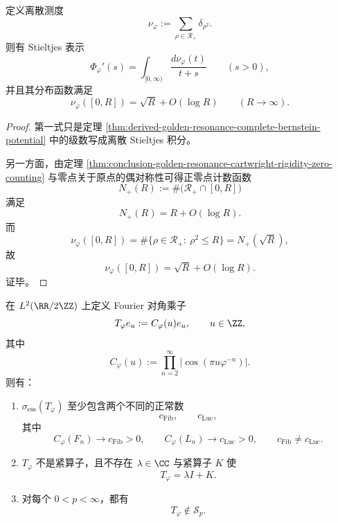 \begin{corollary}[平方零点测度的精确平方根计数律]\label{cor:derived-golden-resonance-squared-zero-measure-sqrt-law}
定义离散测度
\[
\nu_\varphi:=\sum_{\rho\in\mathcal R_+}\delta_{\rho^2}.
\]
则有 Stieltjes 表示
\[
\Phi_\varphi'(s)
=
\int_{[0,\infty)}\frac{d\nu_\varphi(t)}{t+s}
\qquad (s>0),
\]
并且其分布函数满足
\[
\nu_\varphi([0,R])=\sqrt R+O(\log R)
\qquad (R\to\infty).
\]
\end{corollary}

\begin{proof}
第一式只是定理
\ref{thm:derived-golden-resonance-complete-bernstein-potential}
中的级数写成离散 Stieltjes 积分。

另一方面，由定理
\ref{thm:conclusion-golden-resonance-cartwright-rigidity-zero-counting}
与零点关于原点的偶对称性可得正零点计数函数
\[
N_+(R):=\#\bigl(\mathcal R_+\cap[0,R]\bigr)
\]
满足
\[
N_+(R)=R+O(\log R).
\]
而
\[
\nu_\varphi([0,R])
=
\#\{\rho\in\mathcal R_+:\ \rho^2\le R\}
=
N_+(\sqrt R),
\]
故
\[
\nu_\varphi([0,R])=\sqrt R+O(\log R).
\]
证毕。
\end{proof}

\begin{theorem}\label{thm:derived-golden-resonance-diagonal-multiplier-essential-clusters}
在 \(L^2(\RR/2\ZZ)\) 上定义 Fourier 对角乘子
\[
T_\varphi e_u:=C_\varphi(u)e_u,
\qquad
u\in\ZZ,
\]
其中
\[
C_\varphi(u):=\prod_{n=2}^{\infty}\left|\cos(\pi u\varphi^{-n})\right|.
\]
则有：
\begin{enumerate}
  \item \(\sigma_{\mathrm{ess}}(T_\varphi)\) 至少包含两个不同的正常数
  \[
  c_{\mathrm{Fib}},\qquad c_{\mathrm{Luc}},
  \]
  其中
  \[
  C_\varphi(F_n)\to c_{\mathrm{Fib}}>0,
  \qquad
  C_\varphi(L_n)\to c_{\mathrm{Luc}}>0,
  \qquad
  c_{\mathrm{Fib}}\neq c_{\mathrm{Luc}}.
  \]
  \item \(T_\varphi\) 不是紧算子，且不存在 \(\lambda\in\CC\) 与紧算子 \(K\) 使
  \[
  T_\varphi=\lambda I+K.
  \]
  \item 对每个 \(0<p<\infty\)，都有
  \[
  T_\varphi\notin \mathcal S_p.
  \]
\end{enumerate}
\end{theorem}

